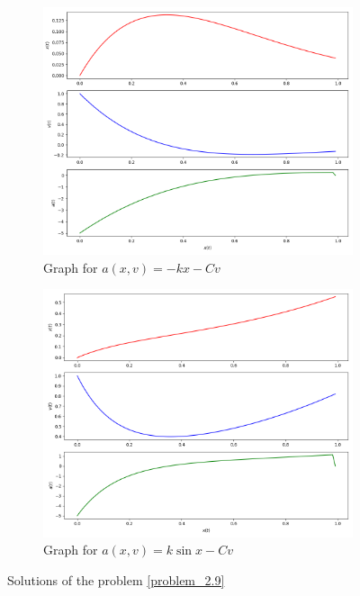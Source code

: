     \begin{figure}[h!]
        \centering
        \begin{subfigure}{\linewidth}
            \includegraphics[width=0.7\linewidth]{img/chapter2/2-9/2_9_accele_a.png}
            \caption{Graph for $a(x,v) = -kx-Cv$}
        \end{subfigure}
        \begin{subfigure}{\linewidth}
            \includegraphics[width=0.7\linewidth]{img/chapter2/2-9/2_9_accele_b.png}
            \caption{Graph for $a(x,v) = k\sin{x}-Cv$}
        \end{subfigure}
        \caption{Solutions of the problem \ref{problem_2.9}}
        \label{fig:problem 2-9}
    \end{figure}


